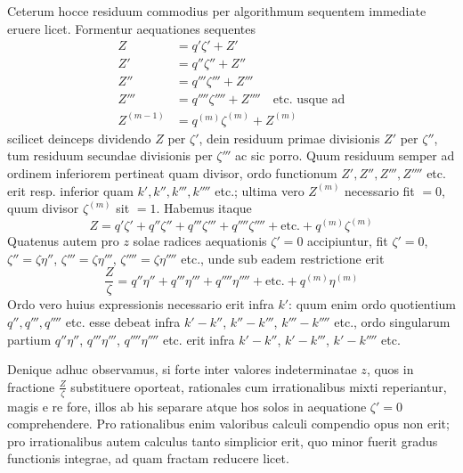 Ceterum hocce residuum commodius per algorithmum sequentem immediate eruere licet. Formentur aequationes sequentes
\[
\begin{aligned}
Z&=q'\zeta'+Z'\\
Z'&=q''\zeta''+Z''\\
Z''&=q'''\zeta'''+Z'''\\
Z'''&=q''''\zeta''''+Z''''\quad\text{etc. usque ad}\\
Z^{(m-1)}&=q^{(m)}\zeta^{(m)}+Z^{(m)}
\end{aligned}
\]
scilicet deinceps dividendo $Z$ per $\zeta'$, dein residuum primae divisionis $Z'$ per $\zeta''$, tum residuum secundae divisionis per $\zeta'''$ ac sic porro. Quum residuum semper ad ordinem inferiorem pertineat quam divisor, ordo functionum $Z',Z'',Z''',Z''''$ etc. erit resp. inferior quam $k',k'',k''',k''''$ etc.; ultima vero $Z^{(m)}$ necessario fit $=0$, quum divisor $\zeta^{(m)}$ sit $=1$. Habemus itaque
\[
Z=q'\zeta'+q''\zeta''+q'''\zeta'''+q''''\zeta''''+\text{etc.}+q^{(m)}\zeta^{(m)}
\]
Quatenus autem pro $z$ solae radices aequationis $\zeta'=0$ accipiuntur, fit $\zeta'=0$, $\zeta''=\zeta\eta''$, $\zeta'''=\zeta\eta'''$, $\zeta''''=\zeta\eta''''$ etc., unde sub eadem restrictione erit
\[
\frac{Z}{\zeta}=q''\eta''+q'''\eta'''+q''''\eta''''+\text{etc.}+q^{(m)}\eta^{(m)}
\]
Ordo vero huius expressionis necessario erit infra $k'$: quum enim ordo quotientium $q'',q''',q''''$ etc. esse debeat infra $k'-k''$, $k''-k'''$, $k'''-k''''$ etc., ordo singularum partium $q''\eta''$, $q'''\eta'''$, $q''''\eta''''$ etc. erit infra $k'-k''$, $k'-k'''$, $k'-k''''$ etc.

Denique adhuc observamus, si forte inter valores indeterminatae $z$, quos in fractione $\frac{Z}{\zeta}$ substituere oporteat, rationales cum irrationalibus mixti reperiantur, magis e re fore, illos ab his separare atque hos solos in aequatione $\zeta'=0$ comprehendere. Pro rationalibus enim valoribus calculi compendio opus non erit; pro irrationalibus autem calculus tanto simplicior erit, quo minor fuerit gradus functionis integrae, ad quam fractam reducere licet.

